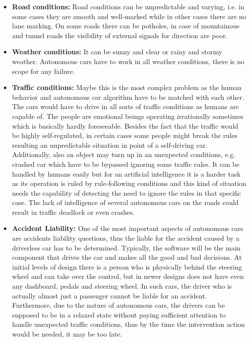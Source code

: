 \documentclass[12pt,english,twoside]{article}
\begin{document}
\begin{itemize}
	\item  \textbf{Road conditions:} 
	Road conditions can be unpredictable and varying, i.e. in some cases they are smooth and well-marked while in other cases there are no lane marking. On some roads there can be potholes, in case of mountainous and tunnel roads the visibility of external signals for direction are poor.
	
	\item 	\textbf{Weather conditions:}
	It can be sunny and clear or rainy and stormy weather. Autonomous cars have to work in all weather conditions, there is no scope for any failure.
	
	\item \textbf{Traffic conditions:}
	Maybe this is the most complex problem as the human behavior and autonomous car algorithm have to be matched with each other. The cars would have to drive in all sorts of traffic conditions as humans are capable of. The people are emotional beings operating irrationally sometimes which is basically hardly foreseeable. Besides the fact that the traffic would be highly self-regulated, in certain cases some people might break the rules resulting an unpredictable situation in point of a self-driving car. Additionally, also an object may turn up in an unexpected conditions, e.g. crashed car which have to be bypassed ignoring some traffic rules. It can be handled by humans easily but for an artificial intelligence it is a harder task as its operation is ruled by rule-following conditions and this kind of situation needs the capability of detecting the need to ignore the rules in that specific case. The lack of intelligence of several autonomous cars on the roads could result in traffic deadlock or even crashes.
	
	\item \textbf{Accident Liability:}
	One of the most important aspects of autonomous cars are accidents liability questions, thus the liable for the accident caused by a driverless car has to be determined.
	Typically, the software will be the main component that drives the car and makes all the good and bad decisions. At initial levels of design there is a person who is physically behind the steering wheel and can take over the control, but in newer designs does not have even any dashboard, pedals and steering wheel. In such cars, the driver who is actually almost just a passenger cannot be liable for an accident. Furthermore, due to the nature of autonomous cars, the drivers can be supposed to be in a relaxed state without paying sufficient attention to handle unexpected traffic conditions, thus by the time the intervention action would be needed, it may be too late.
	

\end{itemize}
\end{document}
